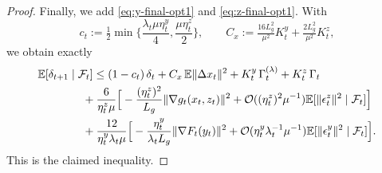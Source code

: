 \documentclass{uai2026} %
\newcommand{\EE}{\mathbb{E}}
\newcommand{\F}{\mathcal{F}}
\begin{document}
\begin{proof}
Finally, we add \eqref{eq:y-final-opt1} and \eqref{eq:z-final-opt1}. With
\[
c_t:=\tfrac12\min\{\frac{\lambda_t\mu\eta_t^y}{4},\frac{\mu\eta_t^z}{2}\},\qquad
C_x:=\tfrac{16L_g^2}{\mu^2}K_t^y+\tfrac{2L_g^2}{\mu^2}K_t^z,
\]
we obtain exactly
\begin{align}
    \MoveEqLeft[4]\EE[\delta_{t+1}\mid\F_t]
\le(1-c_t)\,\delta_t
+C_x\,\EE\|\Delta x_t\|^2
+K_t^y\,\Gamma_t^{(\lambda)}+K_t^z\,\Gamma_t\nonumber\\
&+\frac{6}{\eta_{t}^{z}\mu}\Big[-\frac{(\eta_{t}^{z})^{2}}{L_{g}}\|\nabla g_{t}(x_{t},z_{t})\|^{2}+\mathcal{O}((\eta_{t}^{z})^{2}\mu^{-1})\mathbb{E}[\|\epsilon_{t}^{z}\|^{2}\mid \mathcal{F}_{t}]\Big]\nonumber\\
&+\frac{12}{\eta_{t}^{y}\lambda_{t}\mu}\Big[-\frac{\eta_{t}^{y}}{\lambda_{t}L_{g}}\|\nabla F_{t}(y_{t})\|^{2}+\mathcal{O}(\eta_{t}^{y}\lambda_{t}^{-1}\mu^{-1})\mathbb{E}[\|\epsilon_{t}^{y}\|^{2}\mid \mathcal{F}_{t}]\Big].
\end{align}
This is the claimed inequality.
\end{proof}

\fi
\end{document}
